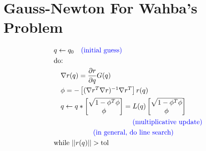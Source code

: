 \documentclass[11pt]{article}
\begin{document}
\section{Gauss-Newton For Wahba's Problem}
\begin{align*}
    &q\leftarrow q_0\quad\textcolor{blue}{\text{(initial guess)}}
    \\
    &\text{do:}
    \\
    & \quad \nabla r(q) = \frac{\partial r}{\partial q}G(q)
    \\
    & \quad \phi = - \begin{bmatrix}
        (\nabla r^T\nabla r)^{-1}\nabla r^T
    \end{bmatrix}r(q)
    \\
    & \quad q\leftarrow q * \begin{bmatrix}
        \sqrt{1 - \phi^T\phi} \\
        \phi
    \end{bmatrix}
    =L(q) \begin{bmatrix}
        \sqrt{1-\phi^T\phi} \\
        \phi
    \end{bmatrix}
    \\
    &\hspace{40mm}\textcolor{blue}{\text{(multiplicative update)}}
    \\
    &\hspace{20mm}\textcolor{blue}{\text{(in general, do line search)}}
    \\
    & \text{while } ||r(q)|| > \text{tol}
\end{align*}
\end{document}
